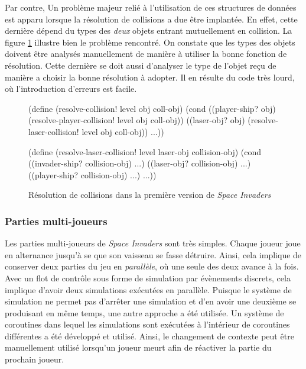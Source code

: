 \documentclass[12pt,twoside,letterpaper,francais]{book}
\begin{document}
Par contre, Un problème majeur relié à l'utilisation de ces structures
de données est apparu lorsque la résolution de collisions a due être
implantée. En effet, cette dernière dépend du types des \emph{deux}
objets entrant mutuellement en collision. La figure
\ref{Exp:si1-col-res} illustre bien le problème rencontré. On constate
que les types des objets doivent être analysés manuellement de manière
à utiliser la bonne fonction de résolution. Cette dernière se doit
aussi d'analyser le type de l'objet reçu de manière a choisir la bonne
résolution à adopter. Il en résulte du code très lourd, où
l'introduction d'erreurs est facile.\\

\begin{figure}[htb!]
  \begin{schemecode}
(define (resolve-collision! level obj coll-obj)
  (cond
   ((player-ship? obj) (resolve-player-collision! level obj coll-obj))
   ((laser-obj? obj) (resolve-laser-collision! level obj coll-obj))
   ...))

(define (resolve-laser-collision! level laser-obj collision-obj)
  (cond ((invader-ship? collision-obj) ...)
        ((laser-obj? collision-obj) ...)
        ((player-ship? collision-obj) ...)
        ...))
  \end{schemecode}
  \caption{Résolution de collisions dans la première version de \textit{Space Invaders}}
  \label{Exp:si1-col-res}
\end{figure}


\FloatBarrier
\subsubsection{Parties multi-joueurs}
Les parties multi-joueurs de \textit{Space Invaders} sont très simples. Chaque joueur joue
en alternance jusqu'à se que son vaisseau se fasse détruire. Ainsi,
cela implique de conserver deux parties du jeu en \emph{parallèle}, où
une seule des deux avance à la fois. Avec un flot de contrôle sous
forme de simulation par évènements discrets, cela implique d'avoir
deux simulations exécutées en parallèle. Puisque le système de
simulation ne permet pas d'arrêter une simulation et d'en avoir une
deuxième se produisant en même temps, une autre approche a été
utilisée. Un système de coroutines dans lequel les simulations sont
exécutées à l'intérieur de coroutines différentes a été développé et
utilisé. Ainsi, le changement de contexte peut être manuellement
utilisé lorsqu'un joueur meurt afin de réactiver la partie du prochain
joueur.
\end{document}
